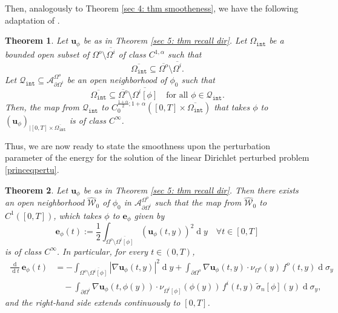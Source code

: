 \documentclass[11pt,reqno,a4paper]{amsart}
\theoremstyle{plain}
\newtheorem{theorem}{Theorem}[section]
\theoremstyle{definition}
\renewcommand{\d}[1]{\ensuremath{\operatorname{d}\!{#1}}}
\begin{document}
Then, analogously to Theorem \ref{sec 4: thm smootheness}, we have the following adaptation of \cite[Thm. 3.7]{DaLuMu25}.

\begin{theorem}\label{sec 5: thm smootheness dir}
    Let $\mathbf{u}_\phi$ be as in Theorem \ref{sec 5: thm recall dir}. Let $\Omega_\mathtt{int}$ be a bounded open subset of $\Omega^o\setminus \overline{\Omega^i}$ of class $C^{1,\alpha}$ such that
    \[
    \overline{\Omega_\mathtt{int}} \subseteq  \overline{\Omega^o} \setminus \overline{\Omega^i}.
    \]
    Let $\mathcal{Q}_\mathtt{int} \subseteq \mathcal{A}^{\Omega^o}_{\partial\Omega^i}$ be an open neighborhood of $\phi_0$ such that  
    \begin{equation*}
        \overline{\Omega_\mathtt{int}} \subseteq \overline{\Omega^o} \setminus \overline{\Omega^i[\phi]} \quad \text{for all }\phi \in \mathcal{Q}_\mathtt{int}.
    \end{equation*}
    Then, the map from $\mathcal{Q}_\mathtt{int}$ to $C_{0}^{\frac{1+\alpha}{2}; 1+\alpha}([0,T] \times \overline{\Omega_\mathtt{int}})$ that takes $\phi$ to $\left(\mathbf{u}_{\phi}\right)_{|[0,T]\times\overline{\Omega_\mathtt{int}}}$ is of class $C^\infty$.
\end{theorem}

Thus, we are now ready to state the smoothness upon the perturbation parameter of the energy for the solution of the linear Dirichlet perturbed problem \eqref{princeqpertu}.

\begin{theorem}\label{thm smooth energy dir}
    Let $\mathbf{u}_\phi$ be as in Theorem \ref{sec 5: thm recall dir}. Then there exists an open neighborhood $\widehat{\mathcal W}_0$ of $\phi_0$ in $\mathcal A_{\partial\Omega^i}^{\Omega^o}$ such that the map from $\widehat{\mathcal{W}}_0$ to $C^1([0,T])$, which takes $\phi$ to $\mathbf{e}_\phi$ given by
    \begin{equation*}
    \mathbf{e}_\phi(t) := \frac{1}{2} \int_{\Omega^o \setminus \overline{\Omega^i[\phi]}} (\mathbf{u}_\phi(t,y))^2 \d y \quad \forall t \in [0,T]
    \end{equation*}
    is of class $C^\infty$. In particular, for every $t\in(0,T)$,
    \begin{equation}\label{eq: derivative of e dir}
    \begin{aligned}
        \frac{\d{}}{\d t}\mathbf{e}_\phi(t) &= -\int_{\Omega^o \setminus \overline{\Omega^i[\phi]}} |\nabla \mathbf{u}_\phi(t,y)|^2 \d y + \int_{\partial\Omega^o}
        \nabla \mathbf{u}_\phi(t,y)\cdot \nu_{\Omega^o}(y)\,f^o(t,y) \d\sigma_y
        \\
        &\quad -\int_{\partial\Omega^i} \nabla \mathbf{u}_\phi(t,\phi(y))\cdot \nu_{\Omega^i[\phi]}(\phi(y))\,f^i(t,y) \, \tilde\sigma_n[\phi](y) \d\sigma_y,
    \end{aligned}
    \end{equation}
    and the right-hand side extends continuously to $[0,T]$.
\end{theorem}
\end{document}
